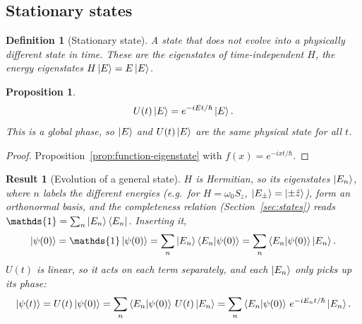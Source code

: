 \documentclass{article}
\newtheorem{definition}{Definition}
\newtheorem{proposition}{Proposition}
\newtheorem{result}{Result}
\newcommand{\id}{\mathds{1}}
\begin{document}
\subsection{Stationary states}
\begin{definition}[Stationary state]
    A state that does not evolve into a physically different state in time. These are the eigenstates of time-independent $H$, the energy eigenstates $H\ket{E} = E\ket{E}$.
\end{definition}
\begin{proposition}
    \begin{equation}
        U(t)\ket{E} = e^{-iEt/\hbar}\ket{E}.
    \end{equation}
    This is a global phase, so $\ket{E}$ and $U(t)\ket{E}$ are the same physical state for all $t$.
\end{proposition}
\begin{proof}
    Proposition~\ref{prop:function-eigenstate} with $f(x) = e^{-ixt/\hbar}$.
\end{proof}
\begin{result}[Evolution of a general state]
    $H$ is Hermitian, so its eigenstates $\ket{E_n}$, where $n$ labels the different energies (e.g.\ for $H = \omega_0S_z$, $\ket{E_\pm} = \ket{\pm\hat{z}}$), form an orthonormal basis, and the completeness relation (Section~\ref{sec:states}) reads $\id = \sum_n\ket{E_n}\bra{E_n}$. Inserting it,
    \[\ket{\psi(0)} = \id\ket{\psi(0)} = \sum_n\ket{E_n}\braket{E_n|\psi(0)} = \sum_n\braket{E_n|\psi(0)}\ket{E_n}.\]
    $U(t)$ is linear, so it acts on each term separately, and each $\ket{E_n}$ only picks up its phase:
    \begin{equation}
        \label{eq:energy-expansion}
        \ket{\psi(t)} = U(t)\ket{\psi(0)} = \sum_n\braket{E_n|\psi(0)}\,U(t)\ket{E_n} = \sum_n\braket{E_n|\psi(0)}\,e^{-iE_nt/\hbar}\ket{E_n}.
    \end{equation}
\end{result}
\end{document}
